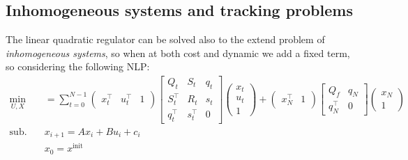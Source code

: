 \subsection{Inhomogeneous systems and tracking problems}
	The linear quadratic regulator can be solved also to the extend problem of \textit{inhomogeneous systems}, so when at both cost and dynamic we add a fixed term, so considering the following NLP:
	\begin{equation} \label{eq:LQRinhomogeneous}
	\begin{aligned}
		\min_{U,X} \quad & = \sum_{t=0}^{N-1} \begin{pmatrix}
			x_t^\top & u_t^\top & 1
		\end{pmatrix} \begin{bmatrix}
			Q_t & S_t & q_t \\ S_t^\top & R_t & s_t \\ q_t^\top & s_t^\top & 0
		\end{bmatrix} \begin{pmatrix}
			x_t \\ u_t \\ 1
		\end{pmatrix}
		+ \begin{pmatrix}
			x_N^\top & 1
		\end{pmatrix} \begin{bmatrix}
			Q_f & q_N \\ q_N^\top & 0 
		\end{bmatrix} \begin{pmatrix}
			x_N \\ 1
		\end{pmatrix} \\
		\textrm{sub. to:} \quad & x_{i+1} = A x_i + B u_i + c_i \\ & x_0 = x^\textrm{init}	
	\end{aligned}
	\end{equation}
	
